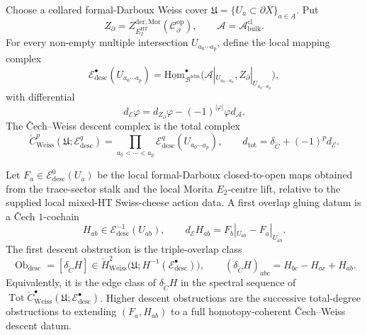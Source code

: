 \begin{defn}\label{app:defn:descent-obstruction-complex}
Choose a collared formal-Darboux Weiss cover
\(\mathfrak U=\{U_a\subset\partial X\}_{a\in A}\).  Put
\[
  Z_\partial=
  Z^{\mathrm{der},\mathrm{Mor}}_{E_2^{\mathrm{HT}}}
  (\mathcal C^{\mathrm{op}}_\partial),
  \qquad
  \mathcal A=\mathcal A^{\mathrm{cl}}_{\mathrm{bulk}}.
\]
For every non-empty multiple intersection
\(U_{a_0\cdots a_p}\), define the local mapping complex
\[
  \mathcal E^\bullet_{\mathrm{desc}}(U_{a_0\cdots a_p})
  =
  \underline{\mathrm{Hom}}^\bullet_{\mathcal B^{\mathrm{adm}}}
  \bigl(\mathcal A|_{U_{a_0\cdots a_p}},
        Z_\partial|_{U_{a_0\cdots a_p}}\bigr),
\]
with differential
\[
  d_{\mathcal E}\varphi
  =
  d_{Z_\partial}\varphi-(-1)^{|\varphi|}\varphi d_{\mathcal A}.
\]
The Čech--Weiss descent complex is the total complex
\[
  \check C^p_{\mathrm{Weiss}}(\mathfrak U;
  \mathcal E^q_{\mathrm{desc}})
  =
  \prod_{a_0<\cdots<a_p}
  \mathcal E^q_{\mathrm{desc}}(U_{a_0\cdots a_p}),
  \qquad
  d_{\mathrm{tot}}=\delta_{\check C}+(-1)^p d_{\mathcal E}.
\]

Let \(F_a\in\mathcal E^0_{\mathrm{desc}}(U_a)\) be the local
formal-Darboux closed-to-open maps obtained from the trace-sector stalk
and the local Morita \(E_2\)-centre lift, relative to the supplied
local mixed-HT Swiss-cheese action data.  A first overlap gluing datum
is a Čech \(1\)-cochain
\[
  H_{ab}\in \mathcal E^{-1}_{\mathrm{desc}}(U_{ab}),
  \qquad
  d_{\mathcal E}H_{ab}=F_b|_{U_{ab}}-F_a|_{U_{ab}}.
\]
The first descent obstruction is the triple-overlap class
\[
  \operatorname{Ob}_{\mathrm{desc}}
  =
  [\delta_{\check C}H]
  \in
  \check H^2_{\mathrm{Weiss}}
  \bigl(\mathfrak U;H^{-1}(\mathcal E^\bullet_{\mathrm{desc}})\bigr),
  \qquad
  (\delta_{\check C}H)_{abc}=H_{bc}-H_{ac}+H_{ab}.
\]
Equivalently, it is the edge class of \(\delta_{\check C}H\) in the
spectral sequence of
\(\operatorname{Tot}\check C^\bullet_{\mathrm{Weiss}}
(\mathfrak U;\mathcal E^\bullet_{\mathrm{desc}})\).  Higher descent
obstructions are the successive total-degree obstructions to extending
\((F_a,H_{ab})\) to a full homotopy-coherent Čech--Weiss descent datum.
\end{defn}


